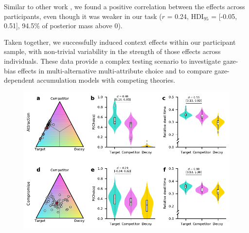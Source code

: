 \documentclass[11pt, a4paper]{article}
\begin{document}
Similar to other work \autocite{berkowitsch2014RigorouslyTestingMultialternative,trueblood2014MultiattributeLinearBallistic}, we found a positive correlation between the effects across participants, even though it was weaker in our task ($r$ = 0.24, HDI$_{95}$ = [-0.05, 0.51], 94.5\% of posterior mass above 0). 

Taken together, we successfully induced context effects within our participant sample, with non-trivial variability in the strength of those effects across individuals. These data provide a complex testing scenario to investigate gaze-bias effects in multi-alternative multi-attribute choice and to compare gaze-dependent accumulation models with competing theories.

\begin{figure}[bt!]
\begin{centering}
\includegraphics[scale=1]{../figures/2-context-effects.pdf}

\end{centering}
\end{figure}
\end{document}
